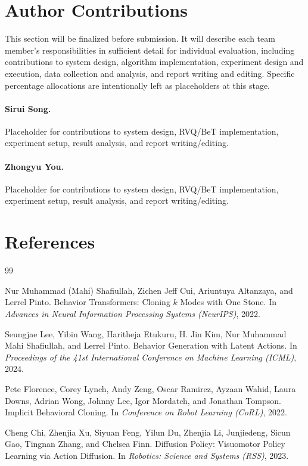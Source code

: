 \documentclass[conference]{IEEEtran}
\begin{document}
\section{Author Contributions}

This section will be finalized before submission. It will describe each team member's responsibilities in sufficient detail for individual evaluation, including contributions to system design, algorithm implementation, experiment design and execution, data collection and analysis, and report writing and editing. Specific percentage allocations are intentionally left as placeholders at this stage.

\paragraph{Sirui Song.}
Placeholder for contributions to system design, RVQ/BeT implementation, experiment setup, result analysis, and report writing/editing.

\paragraph{Zhongyu You.}
Placeholder for contributions to system design, RVQ/BeT implementation, experiment setup, result analysis, and report writing/editing.

\section{References}

\begin{thebibliography}{99}

Nur Muhammad (Mahi) Shafiullah, Zichen Jeff Cui, Ariuntuya Altanzaya, and Lerrel Pinto.
\newblock Behavior Transformers: Cloning $k$ Modes with One Stone.
\newblock In \emph{Advances in Neural Information Processing Systems (NeurIPS)}, 2022.

Seungjae Lee, Yibin Wang, Haritheja Etukuru, H. Jin Kim, Nur Muhammad Mahi Shafiullah, and Lerrel Pinto.
\newblock Behavior Generation with Latent Actions.
\newblock In \emph{Proceedings of the 41st International Conference on Machine Learning (ICML)}, 2024.

Pete Florence, Corey Lynch, Andy Zeng, Oscar Ramirez, Ayzaan Wahid, Laura Downs, Adrian Wong, Johnny Lee, Igor Mordatch, and Jonathan Tompson.
\newblock Implicit Behavioral Cloning.
\newblock In \emph{Conference on Robot Learning (CoRL)}, 2022.

Cheng Chi, Zhenjia Xu, Siyuan Feng, Yilun Du, Zhenjia Li, Junjiedeng, Sicun Gao, Tingnan Zhang, and Chelsea Finn.
\newblock Diffusion Policy: Visuomotor Policy Learning via Action Diffusion.
\newblock In \emph{Robotics: Science and Systems (RSS)}, 2023.

\end{thebibliography}
\end{document}
